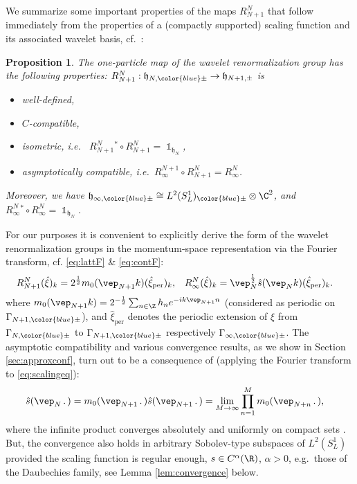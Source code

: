 \documentclass[a4paper, 11pt]{article}
\newcommand{\fh}{\mathfrak{h}}
\DeclareMathOperator{\1}{\mathds{1}}
\DeclareMathOperator{\per}{per}
\newtheorem{prop}[thm]{Proposition}
\begin{document}
We summarize some important properties of the maps $R^{N}_{N+1}$ that follow immediately from the properties of a (compactly supported) scaling function and its associated wavelet basis, cf.~\cite{MeyerWaveletsAndOperators, DaubechiesTenLecturesOn, MorinelliScalingLimitsOf}:
\begin{prop}
\label{prop:waveletrg}
The one-particle map of the wavelet renormalization group has the following properties: $R^{N}_{N+1}:\fh_{N,{\color{blue}\pm}}\rightarrow\fh_{N+1,\pm}$ is
\begin{itemize}
	\item[1.] well-defined,
	\item[2.] $C$-compatible,
	\item[3.] isometric, i.e.~ $R^{N}_{N+1}{}^{\!\!*}\circ R^{N}_{N+1} = \1_{\fh_{N}}$, 
	\item[4.] asymptotically compatible, i.e.~$R^{N+1}_{\infty}\circ R^{N}_{N+1} = R^{N}_{\infty}$.
\end{itemize}
Moreover, we have $\fh_{\infty,{\color{blue}\pm}}\cong L^{2}(S^{1}_{L})_{{\color{blue}\pm}}\otimes\C^{2}$, and $R^{N}_{\infty}{}^{*}\circ R^{N}_{\infty} = \1_{\fh_{N}}$.
\end{prop}
For our purposes it is convenient to explicitly derive the form of the wavelet renormalization groups in the momentum-space representation via the Fourier transform, cf. \eqref{eq:lattF} \& \eqref{eq:contF}:
\begin{align}
\label{eq:waveletrg1pF}
R^{N}_{N+1}(\hat{\xi})_{k} & = 2^{\frac{1}{2}}m_{0}(\vep_{N+1}k)(\hat{\xi}_{\per})_{k}, & R^{N}_{\infty}(\hat{\xi})_{k} & = \vep_{N}^{\frac{1}{2}}\hat{s}(\vep_{N}k)(\hat{\xi}_{\per})_{k}.
\end{align}
where $m_{0}(\vep_{N+1}k) = 2^{-\frac{1}{2}}\sum_{n\in\Z}h_{n}e^{-ik\vep_{N+1}n}$ (considered as periodic on $\Gamma_{N+1,{\color{blue}\pm}}$), and $\hat{\xi}_{\per}$ denotes the periodic extension of $\hat{\xi}$ from $\Gamma_{N,{\color{blue}\pm}}$ to $\Gamma_{N+1,{\color{blue}\pm}}$ respectively $\Gamma_{\infty,{\color{blue}\pm}}$. The asymptotic compatibility and various convergence results, as we show in Section \ref{sec:approxconf}, turn out to be a consequence of (applying the Fourier transform to \eqref{eq:scalingeq}):
\begin{align}
\label{eq:infprod}
\hat{s}(\vep_{N}\!\ .\!\ ) & = m_{0}(\vep_{N+1}\!\ .\!\ )\hat{s}(\vep_{N+1}\!\ .\!\ ) = \lim_{M\rightarrow\infty}\prod_{n=1}^{M}m_{0}(\vep_{N+n}\!\ .\!\ ),
\end{align}
where the infinite product converges absolutely and uniformly on compact sets \cite{DaubechiesTenLecturesOn}. But, the convergence also holds in arbitrary Sobolev-type subspaces of $L^{2}(S^{1}_{L})$ provided the scaling function is regular enough, $s\in C^{\alpha}(\R)$, $\alpha>0$, e.g.~those of the Daubechies family, see Lemma \ref{lem:convergence} below. 
\end{document}
